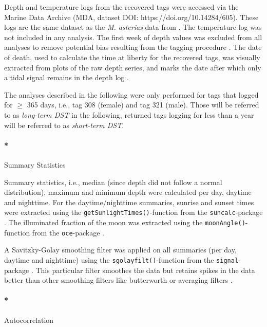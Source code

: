 \documentclass[
  authoryear,
  review,
  3p]{elsarticle}
\let\oldparagraph\paragraph
\renewcommand{\paragraph}[1]{\oldparagraph{#1}\mbox{}}
\begin{document}
Depth and temperature logs from the recovered tags were accessed via the
Marine Data Archive (MDA, dataset DOI: https://doi.org/10.14284/605).
These logs are the same dataset as the \emph{M. asterias} data from
\citet{goossens_2023}. The temperature log was not included in any
analysis. The first week of depth values was excluded from all analyses
to remove potential bias resulting from the tagging procedure
\citep[following][]{flavio_2021}. The date of death, used to calculate
the time at liberty for the recovered tags, was visually extracted from
plots of the raw depth series, and marks the date after which only a
tidal signal remains in the depth log \citep[characterised by cyclically
rising and falling depths within a rough 2 m depth
range,][]{kvale_2006}.

The analyses described in the following were only performed for tags
that logged for \(\geq\) 365 days, i.e., tag 308 (female) and tag 321
(male). Those will be referred to as \emph{long-term DST} in the
following, returned tags logging for less than a year will be referred
to as \emph{short-term DST}.

\hypertarget{summary-statistics}{%
\paragraph*{Summary Statistics}\label{summary-statistics}}

Summary statistics, i.e., median (since depth did not follow a normal
distribution), maximum and minimum depth were calculated per day,
daytime and nighttime. For the daytime/nighttime summaries, sunrise and
sunset times were extracted using the
\texttt{getSunlightTimes()}-function from the \texttt{suncalc}-package
\citep{suncalc}. The illuminated fraction of the moon was extracted
using the \texttt{moonAngle()}-function from the \texttt{oce}-package
\citep{oce}.

A Savitzky-Golay smoothing filter \citep[ filter order \emph{p = 1},
filter length \emph{n = 5}]{press_1990} was applied on all summaries
(per day, daytime and nighttime) using the
\texttt{sgolayfilt()}-function from the \texttt{signal}-package
\citep{signal}. This particular filter smoothes the data but retains
spikes in the data better than other smoothing filters like butterworth
or averaging filters \citep[such as a rolling mean,][]{schafer_2011}.

\hypertarget{autocorrelation}{%
\paragraph*{Autocorrelation}\label{autocorrelation}}
\end{document}
